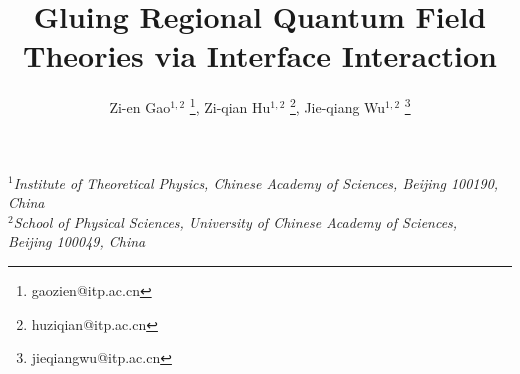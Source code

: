 \title{\textbf{Gluing Regional Quantum Field Theories via Interface Interaction}}
\author{
Zi-en Gao${}^{1,2}$ \footnote{gaozien@itp.ac.cn},\quad
Zi-qian Hu${}^{1,2}$ \footnote{huziqian@itp.ac.cn},\quad
Jie-qiang Wu${}^{1,2}$ \footnote{jieqiangwu@itp.ac.cn}
}
\date{}
\maketitle

\begin{center}
{\it
$^{1}$Institute of Theoretical Physics, Chinese Academy of Sciences, Beijing 100190, China \\
$^{2}$School of Physical Sciences, University of Chinese Academy of Sciences, \\ Beijing 100049, China
}
\end{center}
